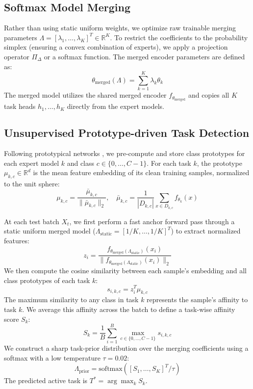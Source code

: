 \documentclass{article}
\theoremstyle{plain}
\theoremstyle{definition}
\theoremstyle{remark}
\begin{document}
\subsection{Softmax Model Merging}
Rather than using static uniform weights, we optimize raw trainable merging parameters $\Lambda = [\lambda_1, \dots, \lambda_K]^T \in \mathbb{R}^K$. To restrict the coefficients to the probability simplex (ensuring a convex combination of experts), we apply a projection operator $\Pi_\Delta$ or a softmax function. The merged encoder parameters are defined as:
\begin{equation}
    \theta_{\text{merged}}(\Lambda) = \sum_{k=1}^K \lambda_k \theta_k
\end{equation}
The merged model utilizes the shared merged encoder $f_{\theta_{\text{merged}}}$ and copies all $K$ task heads $h_1, \dots, h_K$ directly from the expert models.

\subsection{Unsupervised Prototype-driven Task Detection}
Following prototypical networks \cite{snell17}, we pre-compute and store class prototypes for each expert model $k$ and class $c \in \{0, \dots, C-1\}$. For each task $k$, the prototype $\mu_{k,c} \in \mathbb{R}^d$ is the mean feature embedding of its clean training samples, normalized to the unit sphere:
\begin{equation}
    \mu_{k,c} = \frac{\bar{\mu}_{k,c}}{\|\bar{\mu}_{k,c}\|_2}, \quad \bar{\mu}_{k,c} = \frac{1}{|D_{k,c}|} \sum_{x \in D_{k,c}} f_{\theta_k}(x)
\end{equation}

At each test batch $X_t$, we first perform a fast anchor forward pass through a static uniform merged model ($\Lambda_{\text{static}} = [1/K, \dots, 1/K]^T$) to extract normalized features:
\begin{equation}
    z_i = \frac{f_{\theta_{\text{merged}}(\Lambda_{\text{static}})}(x_i)}{\|f_{\theta_{\text{merged}}(\Lambda_{\text{static}})}(x_i)\|_2}
\end{equation}
We then compute the cosine similarity between each sample's embedding and all class prototypes of each task $k$:
\begin{equation}
    s_{i,k,c} = z_i^T \mu_{k,c}
\end{equation}
The maximum similarity to any class in task $k$ represents the sample's affinity to task $k$. We average this affinity across the batch to define a task-wise affinity score $S_k$:
\begin{equation}
    S_k = \frac{1}{B} \sum_{i=1}^B \max_{c \in \{0, \dots, C-1\}} s_{i,k,c}
\end{equation}
We construct a sharp task-prior distribution over the merging coefficients using a softmax with a low temperature $\tau = 0.02$:
\begin{equation}
    \Lambda_{\text{prior}} = \text{softmax}([S_1, \dots, S_K]^T / \tau)
\end{equation}
The predicted active task is $T^* = \arg\max_k S_k$.
\end{document}
